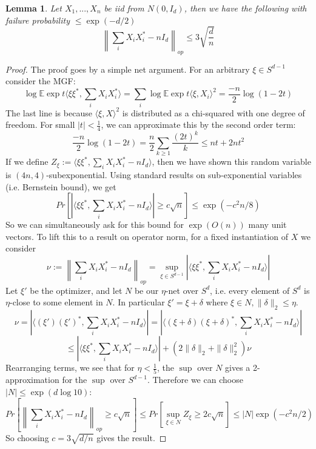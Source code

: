 \documentclass{article}
\newtheorem{lemma}[theorem]{Lemma}
\newcommand{\E}{\mathbb{E}}
\begin{document}
\begin{lemma}
Let $X_{1}, ..., X_{n}$ be iid from $N(0,I_{d})$, then we have the following with failure probability $\leq \exp(-d/2)$
\[ \left\| \sum_{i} X_{i} X_{i}^{*} - n I_{d} \right\|_{op} \leq     3 \sqrt{\frac{d}{n}}  \]
\end{lemma}
\begin{proof}
The proof goes by a simple net argument. For an arbitrary $\xi \in S^{d-1}$ consider the MGF:
\[ \log \E \exp t \langle \xi \xi^{*}, \sum_{i} X_{i} X_{i}^{*} \rangle = \sum_{i} \log \E \exp t \langle \xi, X_{i} \rangle^{2} = \frac{-n}{2} \log (1 - 2t)     \]
The last line is because $\langle \xi, X \rangle^{2}$ is distributed as a chi-squared with one degree of freedom. For small $|t| < \frac{1}{4}$, we can approximate this by the second order term:
\[ \frac{-n}{2} \log (1 - 2t) = \frac{n}{2} \sum_{k \geq 1} \frac{(2t)^{k}}{k} \leq n t + 2 n t^{2}    \]
If we define $Z_{\xi} := \langle \xi \xi^{*}, \sum_{i} X_{i} X_{i}^{*} - n I_{d} \rangle$, then we have shown this random variable is $(4n, 4)$-subexponential. Using standard results on sub-exponential variables (i.e. Bernstein bound), we get
\[ Pr \left[ |\langle \xi \xi^{*}, \sum_{i} X_{i} X_{i}^{*}  - n I_{d} \rangle | \geq c \sqrt{n}  \right] \leq \exp( - c^{2} n / 8)     \]
So we can simultaneously ask for this bound for $\exp(O(n))$ many unit vectors. To lift this to a result on operator norm, for a fixed instantiation of $X$ we consider 
\[ \nu := \left\| \sum_{i} X_{i} X_{i}^{*} - n I_{d} \right\|_{op} = \sup_{\xi \in S^{d-1}} |\langle \xi \xi^{*}, \sum_{i} X_{i} X_{i}^{*} - n I_{d} \rangle|    \]
Let $\xi'$ be the optimizer, and let $N$ be our $\eta$-net over $S^{d}$, i.e. every element of $S^{d}$ is $\eta$-close to some element in $N$. In particular $\xi' = \xi + \delta$ where $\xi \in N, \|\delta\|_{2} \leq \eta$. 
\[ \nu = |\langle (\xi') (\xi')^{*}, \sum_{i} X_{i} X_{i}^{*} - n I_{d} \rangle| = |\langle (\xi + \delta) (\xi + \delta)^{*}, \sum_{i} X_{i} X_{i}^{*} - n I_{d} \rangle|      \]
\[ \leq |\langle \xi \xi^{*}, \sum_{i} X_{i} X_{i}^{*} - n I_{d} \rangle| + (2 \|\delta\|_{2} + \|\delta\|_{2}^{2}) \nu    \]
Rearranging terms, we see that for $\eta < \frac{1}{5}$, the $\sup$ over $N$ gives a 2-approximation for the $\sup$ over $S^{d-1}$. Therefore we can choose $|N| \leq \exp( d \log 10)$:
\[ Pr \left[ \left\| \sum_{i} X_{i} X_{i}^{*} - n I_{d} \right\|_{op} \geq c \sqrt{n}  \right] \leq Pr \left[ \sup_{\xi \in N} Z_{\xi} \geq 2 c \sqrt{n}  \right] \leq |N| \exp( - c^{2} n / 2)    \]
So choosing $c = 3 \sqrt{d/n}$ gives the result. 
\end{proof}
\end{document}
